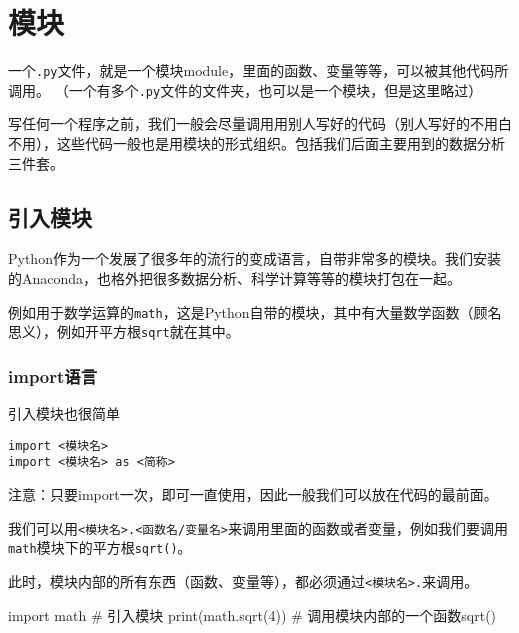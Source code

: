 \documentclass[
  letterpaper,
  DIV=11,
  numbers=noendperiod]{scrreprt}
\newenvironment{Shaded}{\begin{snugshade}}{\end{snugshade}}
\newcommand{\BuiltInTok}[1]{\textcolor[rgb]{0.00,0.23,0.31}{#1}}
\newcommand{\CommentTok}[1]{\textcolor[rgb]{0.37,0.37,0.37}{#1}}
\newcommand{\DecValTok}[1]{\textcolor[rgb]{0.68,0.00,0.00}{#1}}
\newcommand{\ImportTok}[1]{\textcolor[rgb]{0.00,0.46,0.62}{#1}}
\newcommand{\NormalTok}[1]{\textcolor[rgb]{0.00,0.23,0.31}{#1}}
\begin{document}
\hypertarget{ux6a21ux5757}{%
\chapter{模块}\label{ux6a21ux5757}}

一个\texttt{.py}文件，就是一个模块module，里面的函数、变量等等，可以被其他代码所调用。
（一个有多个\texttt{.py}文件的文件夹，也可以是一个模块，但是这里略过）

写任何一个程序之前，我们一般会尽量调用用别人写好的代码（别人写好的不用白不用），这些代码一般也是用模块的形式组织。包括我们后面主要用到的数据分析三件套。

\hypertarget{ux5f15ux5165ux6a21ux5757}{%
\section{引入模块}\label{ux5f15ux5165ux6a21ux5757}}

Python作为一个发展了很多年的流行的变成语言，自带非常多的模块。我们安装的Anaconda，也格外把很多数据分析、科学计算等等的模块打包在一起。

例如用于数学运算的\texttt{math}，这是Python自带的模块，其中有大量数学函数（顾名思义），例如开平方根\texttt{sqrt}就在其中。

\hypertarget{importux8bedux8a00}{%
\subsection{import语言}\label{importux8bedux8a00}}

引入模块也很简单

\begin{verbatim}
import <模块名>
import <模块名> as <简称>
\end{verbatim}

注意：只要import一次，即可一直使用，因此一般我们可以放在代码的最前面。

我们可以用\texttt{\textless{}模块名\textgreater{}.\textless{}函数名/变量名\textgreater{}}来调用里面的函数或者变量，例如我们要调用\texttt{math}模块下的平方根\texttt{sqrt()}。

此时，模块内部的所有东西（函数、变量等），都必须通过\texttt{\textless{}模块名\textgreater{}.}来调用。

\begin{Shaded}
\begin{Highlighting}[]
\ImportTok{import}\NormalTok{ math }\CommentTok{\# 引入模块}
\BuiltInTok{print}\NormalTok{(math.sqrt(}\DecValTok{4}\NormalTok{)) }\CommentTok{\# 调用模块内部的一个函数sqrt()}
\end{Highlighting}
\end{Shaded}
\end{document}
